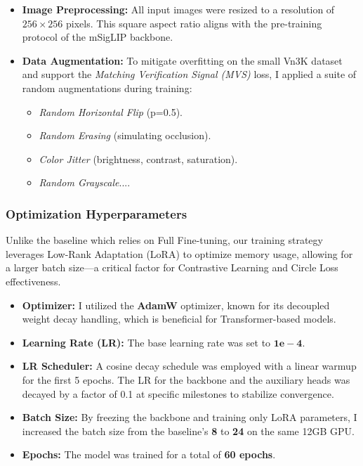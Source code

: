 \documentclass[../main.tex]{subfiles}
\begin{document}
\begin{itemize}
    \item \textbf{Image Preprocessing:} All input images were resized to a resolution of $256 \times 256$ pixels. This square aspect ratio aligns with the pre-training protocol of the mSigLIP backbone.
    \item \textbf{Data Augmentation:} To mitigate overfitting on the small Vn3K dataset and support the \textit{Matching Verification Signal (MVS)} loss, I applied a suite of random augmentations during training:
    \begin{itemize}
        \item \textit{Random Horizontal Flip} (p=0.5).
        \item \textit{Random Erasing} (simulating occlusion).
        \item \textit{Color Jitter} (brightness, contrast, saturation).
        \item \textit{Random Grayscale}....
    \end{itemize}
\end{itemize}

\subsubsection{Optimization Hyperparameters}
Unlike the baseline which relies on Full Fine-tuning, our training strategy leverages Low-Rank Adaptation (LoRA) to optimize memory usage, allowing for a larger batch size—a critical factor for Contrastive Learning and Circle Loss effectiveness.

\begin{itemize}
    \item \textbf{Optimizer:} I utilized the \textbf{AdamW} optimizer, known for its decoupled weight decay handling, which is beneficial for Transformer-based models.
    \item \textbf{Learning Rate (LR):} The base learning rate was set to $\mathbf{1e-4}$.
    \item \textbf{LR Scheduler:} A cosine decay schedule was employed with a linear warmup for the first 5 epochs. The LR for the backbone and the auxiliary heads was decayed by a factor of 0.1 at specific milestones to stabilize convergence.
    \item \textbf{Batch Size:} By freezing the backbone and training only LoRA parameters, I increased the batch size from the baseline's \textbf{8} to \textbf{24} on the same 12GB GPU.
    \item \textbf{Epochs:} The model was trained for a total of \textbf{60 epochs}.
\end{itemize}
\end{document}

